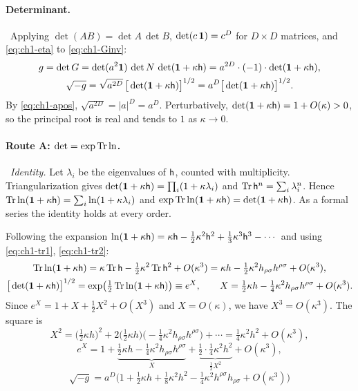 \paragraph{Determinant.} \tD\ Applying $\det(AB)=\det A\,\det B$,
$\det(c\,\mathbf{1})=c^D$ for $D\times D$ matrices, and \eqref{eq:ch1-eta} to
\eqref{eq:ch1-Ginv}:
\begin{gather}
g=\det G=\det(a^2\mathbf{1})\,\det N\,\det(\mathbf{1}+\kappa\mathsf{h})=a^{2D}\cdot(-1)\cdot\det(\mathbf{1}+\kappa\mathsf{h}),
\label{eq:ch1-detg}\\
\sqrt{-g}=\sqrt{a^{2D}}\,\big[\det(\mathbf{1}+\kappa\mathsf{h})\big]^{1/2}=a^D\big[\det(\mathbf{1}+\kappa\mathsf{h})\big]^{1/2}.
\label{eq:ch1-sqrtg}
\end{gather}
By \eqref{eq:ch1-apos}, $\sqrt{a^{2D}}=|a|^D=a^D$. Perturbatively,
$\det(\mathbf{1}+\kappa\mathsf{h})=1+O(\kappa)>0$, so the principal root is real and tends
to $1$ as $\kappa\to0$.

\paragraph{Route A: $\det=\exp\operatorname{Tr}\ln$.} \tD\ \emph{Identity.} Let
$\lambda_i$ be the eigenvalues of $\mathsf{h}$, counted with multiplicity.
Triangularization gives $\det(\mathbf{1}+\kappa\mathsf{h})=\prod_i(1+\kappa\lambda_i)$ and
$\operatorname{Tr}\mathsf{h}^n=\sum_i\lambda_i^n$. Hence
$\operatorname{Tr}\ln(\mathbf{1}+\kappa\mathsf{h})=\sum_i\ln(1+\kappa\lambda_i)$ and
$\exp\operatorname{Tr}\ln(\mathbf{1}+\kappa\mathsf{h})=\det(\mathbf{1}+\kappa\mathsf{h})$. As a formal series the
identity holds at every order.

Following the expansion
$\ln(\mathbf{1}+\kappa\mathsf{h})=\kappa\mathsf{h}-\tfrac12\kappa^2\mathsf{h}^2+\tfrac13\kappa^3\mathsf{h}^3-\cdots$
and using \eqref{eq:ch1-tr1}, \eqref{eq:ch1-tr2}:
\begin{gather}
\operatorname{Tr}\ln(\mathbf{1}+\kappa\mathsf{h})=\kappa\operatorname{Tr}\mathsf{h}-\tfrac12\kappa^2\operatorname{Tr}\mathsf{h}^2+O(\kappa^3)=\kappa h-\tfrac12\kappa^2h_{\rho\sigma}h^{\rho\sigma}+O(\kappa^3),
\label{eq:ch1-trln}\\
\big[\det(\mathbf{1}+\kappa\mathsf{h})\big]^{1/2}=\exp\!\big(\tfrac12\operatorname{Tr}\ln(\mathbf{1}+\kappa\mathsf{h})\big)\equiv e^X,\qquad X=\tfrac12\kappa h-\tfrac14\kappa^2h_{\rho\sigma}h^{\rho\sigma}+O(\kappa^3).
\label{eq:ch1-X}
\end{gather}
Since $e^X=1+X+\tfrac12X^2+O(X^3)$ and $X=O(\kappa)$, we have $X^3=O(\kappa^3)$.
The square is
\begin{equation*}
X^2=\big(\tfrac12\kappa h\big)^2+2\big(\tfrac12\kappa h\big)\big(-\tfrac14\kappa^2h_{\rho\sigma}h^{\rho\sigma}\big)+\cdots=\tfrac14\kappa^2h^2+O(\kappa^3),
\end{equation*}
\begin{equation*}
e^X=1+\underbrace{\tfrac12\kappa h-\tfrac14\kappa^2h_{\rho\sigma}h^{\rho\sigma}}_{X}+\underbrace{\tfrac12\cdot\tfrac14\kappa^2h^2}_{\frac12X^2}+O(\kappa^3),
\end{equation*}
\begin{equation*}
\boxed{\;\sqrt{-g}=a^D\Big(1+\tfrac12\kappa h+\tfrac18\kappa^2h^2-\tfrac14\kappa^2h^{\rho\sigma}h_{\rho\sigma}+O(\kappa^3)\Big)\;}
\tag{I.5}\label{eq:ch1-vol}
\end{equation*}

